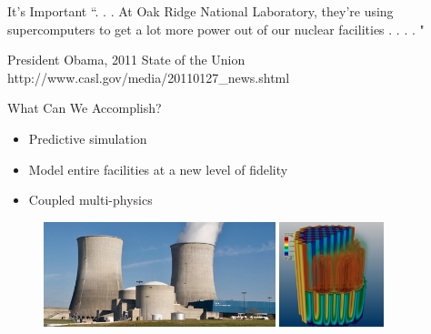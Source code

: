 \documentclass[xcolor=x11names,compress]{beamer}
\renewcommand{\(}{\begin{columns}}
\renewcommand{\)}{\end{columns}}
\newcommand{\<}[1]{\begin{column}{#1}}
\renewcommand{\>}{\end{column}}
\begin{document}
\begin{frame}{It's Important}
``. . . At Oak Ridge National Laboratory, they're using supercomputers to get a lot more power out of our nuclear facilities . . . . "

\vspace*{0.5 in}
President Obama, 2011 State of the Union\\
http://www.casl.gov/media/20110127\_news.shtml
\end{frame}

\begin{frame}{What Can We Accomplish?}
\begin{itemize}
\item Predictive simulation 
\item Model entire facilities at a new level of fidelity
\item Coupled multi-physics
\end{itemize}
\begin{figure}
\includegraphics[height=1.2in,clip]{WattsBar}
\hfill
\includegraphics[height=1.2in,clip]{DenovoCore}
\end{figure}
\end{frame}
\end{document}
